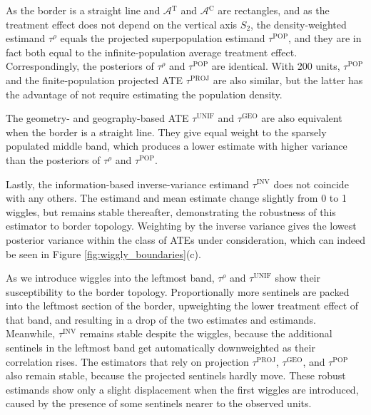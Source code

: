 \documentclass[letter]{article}
\newcommand{\area}{\mathcal{A}}
\newcommand{\treat}{\mathrm{T}}
\newcommand{\ctrol}{\mathrm{C}}
\newcommand{\treatarea}{\area{}^{\treat}}
\newcommand{\ctrolarea}{\area{}^{\ctrol}}
\newcommand{\unifavg}{\tau^{\mathrm{UNIF}}}
\newcommand{\invvar}{\tau^{\mathrm{INV}}}
\newcommand{\taurho}{\tau^{\rho}}
\newcommand{\tauproj}{\tau^{\mathrm{PROJ}}}
\newcommand{\taugeo}{\tau^{\mathrm{GEO}}}
\newcommand{\taupop}{\tau^{\mathrm{POP}}}
\begin{document}
As the border is a straight line and \(\treatarea\) and \(\ctrolarea\) are rectangles,
and as the treatment effect does not depend on the vertical axis \(S_2\),
the density-weighted estimand \(\taurho\) equals the projected superpopulation estimand \(\taupop\),
and they are in fact both equal to the infinite-population average treatment effect.
Correspondingly, the posteriors of \(\taurho\) and \(\taupop\) are identical.
With 200 units, \(\taupop\) and the finite-population projected ATE \(\tauproj\) are also similar, but the latter has the advantage of not require estimating the population density.

The geometry- and geography-based ATE \(\unifavg\) and \(\taugeo\) are also equivalent when the border is a straight line.
They give equal weight to the sparsely populated middle band, which produces a lower estimate with higher variance than the posteriors of \(\taurho\) and \(\taupop\).

Lastly, the information-based inverse-variance estimand \(\invvar\) does not coincide with any others.
The estimand and mean estimate change slightly from 0 to 1 wiggles, but remains stable thereafter, demonstrating the robustness of this estimator to border topology.
Weighting by the inverse variance gives the lowest posterior variance within the class of ATEs under consideration, which can indeed be seen in Figure \ref{fig:wiggly_boundaries}(c).

As we introduce wiggles into the leftmost band,
\(\taurho\) and \(\unifavg\) show their susceptibility to the border topology.
Proportionally more sentinels are packed into the leftmost section of the border,
upweighting the lower treatment effect of that band,
and resulting in a drop of the two estimates and estimands.
Meanwhile, \(\invvar\) remains stable despite the wiggles,
because the additional sentinels in the leftmost
band get automatically downweighted as their correlation rises.
The estimators that rely on projection
\(\tauproj\), \(\taugeo\), and \(\taupop\) also remain stable,
because the projected sentinels hardly move.
These robust estimands show only a slight displacement when the first wiggles are introduced,
caused by the presence of some sentinels nearer to the observed units.
    
\end{document}
